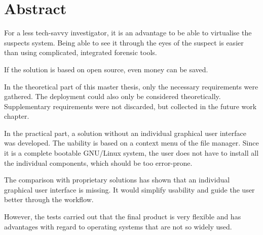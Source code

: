 \chapter*{Abstract}

For a less tech-savvy investigator, it is an advantage to be able to virtualise the suspects system. Being able to see it through the eyes of the suspect is easier than using complicated, integrated forensic tools.

If the solution is based on open source, even money can be saved.

In the theoretical part of this master thesis, only the necessary requirements were gathered. The deployment could also only be considered theoretically. Supplementary requirements were not discarded, but collected in the future work chapter.

In the practical part, a solution without an individual graphical user interface was developed. The uability is based on a context menu of the file manager. Since it is a complete bootable GNU/Linux system, the user does not have to install all the individual components, which should be too error-prone.

The comparison with proprietary solutions has shown that an individual graphical user interface is missing. It would simplify usability and guide the user better through the workflow.

However, the tests carried out that the final product is very flexible and has advantages with regard to operating systems that are not so widely used.